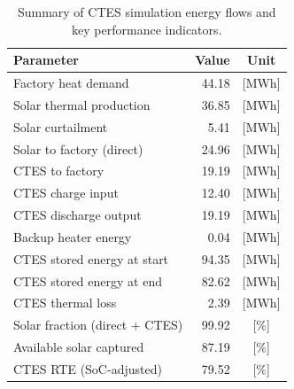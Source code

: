 \renewcommand{\arraystretch}{1.2}
\begin{table}[h]
\centering
\begin{tabular}{l|r c}
\hline
Parameter & Value & Unit \\
\hline
Factory heat demand & 44.18 & [MWh] \\
Solar thermal production & 36.85 & [MWh] \\
Solar curtailment & 5.41 & [MWh] \\
Solar to factory (direct) & 24.96 & [MWh] \\
CTES to factory & 19.19 & [MWh] \\
CTES charge input & 12.40 & [MWh] \\
CTES discharge output & 19.19 & [MWh] \\
Backup heater energy & 0.04 & [MWh] \\
CTES stored energy at start & 94.35 & [MWh] \\
CTES stored energy at end & 82.62 & [MWh] \\
CTES thermal loss & 2.39 & [MWh] \\
\hline
Solar fraction (direct + CTES) & 99.92 & [\%] \\
Available solar captured & 87.19 & [\%] \\
CTES RTE (SoC-adjusted) & 79.52 & [\%] \\
\hline
\end{tabular}
\caption{Summary of CTES simulation energy flows and key performance indicators.}
\label{tab:ctes-simulation-summary}
\end{table}
